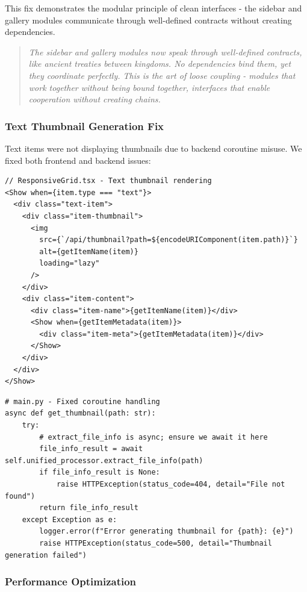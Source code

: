 \documentclass[11pt]{article}
\begin{document}
This fix demonstrates the modular principle of clean interfaces - the sidebar and gallery modules communicate through well-defined contracts without creating dependencies.

\begin{quote}
\emph{The sidebar and gallery modules now speak through well-defined contracts, like ancient treaties between kingdoms. No dependencies bind them, yet they coordinate perfectly. This is the art of loose coupling - modules that work together without being bound together, interfaces that enable cooperation without creating chains.}
\end{quote}

\subsubsection{Text Thumbnail Generation Fix}

Text items were not displaying thumbnails due to backend coroutine misuse. We fixed both frontend and backend issues:

\begin{lstlisting}[style=typescript]
// ResponsiveGrid.tsx - Text thumbnail rendering
<Show when={item.type === "text"}>
  <div class="text-item">
    <div class="item-thumbnail">
      <img 
        src={`/api/thumbnail?path=${encodeURIComponent(item.path)}`}
        alt={getItemName(item)}
        loading="lazy"
      />
    </div>
    <div class="item-content">
      <div class="item-name">{getItemName(item)}</div>
      <Show when={getItemMetadata(item)}>
        <div class="item-meta">{getItemMetadata(item)}</div>
      </Show>
    </div>
  </div>
</Show>
\end{lstlisting}

\begin{lstlisting}[style=python]
# main.py - Fixed coroutine handling
async def get_thumbnail(path: str):
    try:
        # extract_file_info is async; ensure we await it here
        file_info_result = await self.unified_processor.extract_file_info(path)
        if file_info_result is None:
            raise HTTPException(status_code=404, detail="File not found")
        return file_info_result
    except Exception as e:
        logger.error(f"Error generating thumbnail for {path}: {e}")
        raise HTTPException(status_code=500, detail="Thumbnail generation failed")
\end{lstlisting}

\subsubsection{Performance Optimization}
\end{document}
